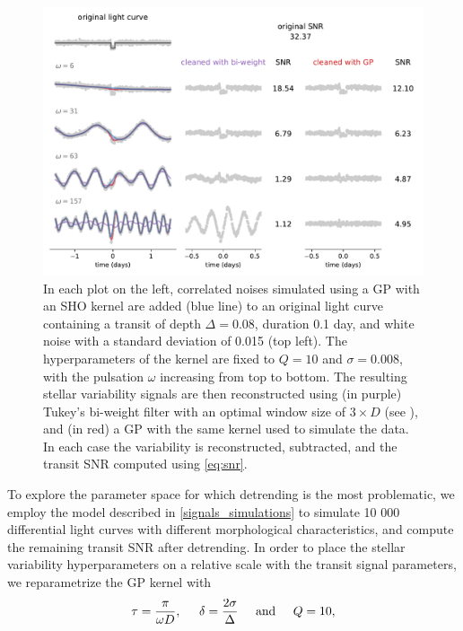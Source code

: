 \documentclass[modern]{aastex631}
\begin{document}
\begin{figure}[H]
    \begin{centering}
        \includegraphics[width=\linewidth]{../workflows/plot_issues/figures/issue2.pdf}
        \caption{In each plot on the left, correlated noises simulated using a GP with an SHO kernel are added (blue line) to an original light curve containing a transit of depth $\Delta = 0.08$, duration 0.1 day, and white noise with a standard deviation of 0.015 (top left). The hyperparameters of the kernel are fixed to $Q=10$ and $\sigma=0.008$, with the pulsation $\omega$ increasing from top to bottom. The resulting stellar variability signals are then reconstructed using (in purple) Tukey's bi-weight filter with an optimal window size of $3\times D$  (see \citealt{wotan}), and (in red) a GP with the same kernel used to simulate the data. In each case the variability is reconstructed, subtracted, and the transit SNR computed using \autoref{eq:snr}.}
        \label{fig:issue2}
    \end{centering}
\end{figure}
To explore the parameter space for which detrending is the most problematic, we employ the model described in \autoref{signals_simulations} to simulate 10 000 differential light curves with different morphological characteristics, and compute the remaining transit SNR after detrending. In order to place the stellar variability hyperparameters on a relative scale with the transit signal parameters, we reparametrize the GP kernel with
\begin{equation}\label{eq:relative_params}
    \tau = \frac{\pi}{\omega D}, \hspace{0.5cm} 
    \delta = \frac{2\sigma}{\Delta} \hspace{0.5cm}  \text{and}  \hspace{0.5cm}  
    Q = 10,
\end{equation}
\end{document}
